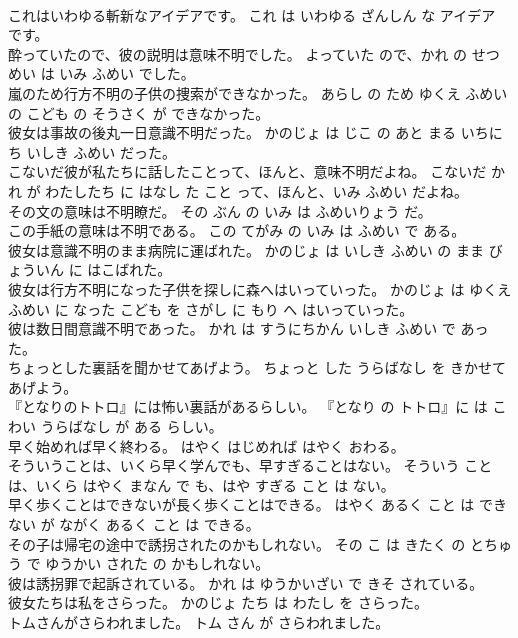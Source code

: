 \documentclass[8pt]{extreport}
\begin{document}
\begin{CJK}{UTF8}{min}
\\	これはいわゆる斬新なアイデアです。	これ は いわゆる ざんしん な アイデア です。	
\\	酔っていたので、彼の説明は意味不明でした。	よっていた ので、かれ の せつめい は いみ ふめい でした。	
\\	嵐のため行方不明の子供の捜索ができなかった。	あらし の ため ゆくえ ふめい の こども の そうさく が できなかった。	
\\	彼女は事故の後丸一日意識不明だった。	かのじょ は じこ の あと まる いちにち いしき ふめい だった。	
\\	こないだ彼が私たちに話したことって、ほんと、意味不明だよね。	こないだ かれ が わたしたち に はなし た こと って、ほんと、いみ ふめい だよね。	
\\	その文の意味は不明瞭だ。	その ぶん の いみ は ふめいりょう だ。	
\\	この手紙の意味は不明である。	この てがみ の いみ は ふめい で ある。	
\\	彼女は意識不明のまま病院に運ばれた。	かのじょ は いしき ふめい の まま びょういん に はこばれた。	
\\	彼女は行方不明になった子供を探しに森へはいっていった。	かのじょ は ゆくえ ふめい に なった こども を さがし に もり へ はいっていった。	
\\	彼は数日間意識不明であった。	かれ は すうにちかん いしき ふめい で あった。	
\\	ちょっとした裏話を聞かせてあげよう。	ちょっと した うらばなし を きかせて あげよう。	
\\	『となりのトトロ』には怖い裏話があるらしい。	『となり の トトロ』に は こわい うらばなし が ある らしい。	
\\	早く始めれば早く終わる。	はやく はじめれば はやく おわる。	
\\	そういうことは、いくら早く学んでも、早すぎることはない。	そういう こと は、いくら はやく まなん で も、はや すぎる こと は ない。	
\\	早く歩くことはできないが長く歩くことはできる。	はやく あるく こと は でき ない が ながく あるく こと は できる。	
\\	その子は帰宅の途中で誘拐されたのかもしれない。	その こ は きたく の とちゅう で ゆうかい された の かもしれない。	
\\	彼は誘拐罪で起訴されている。	かれ は ゆうかいざい で きそ されている。	
\\	彼女たちは私をさらった。	かのじょ たち は わたし を さらった。	
\\	トムさんがさらわれました。	トム さん が さらわれました。	

\end{CJK}
\end{document}
